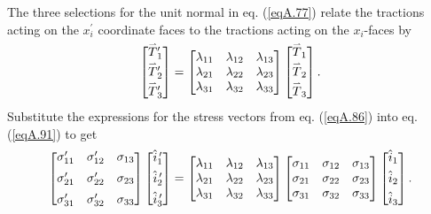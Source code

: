 \documentclass{AeroStructure-ERJohnson}
\def\harp#1{\smash{\mathord{\buildrel{\lower3pt\hbox{$\scriptscriptstyle\rightharpoonup$}}\over{#1}}}}
\begin{document}
The three selections for the unit normal in eq. (\ref{eqA.77}) relate the tractions acting on the $x_{i}^{\prime}$ coordinate faces to the tractions acting on the $x_{i}$-faces by
\begin{align}\label{eqA.91}
\left[\begin{array}{@{}c@{}}\harp{T}_{1}^{\prime} \\[4pt] \harp{T}_{2}^{\prime} \\[4pt] \harp{T}_{3}^{\prime}\end{array}\right]=\left[\begin{array}{@{}lll@{}}\lambda_{11} & \lambda_{12} & \lambda_{13} \\\lambda_{21} & \lambda_{22} & \lambda_{23} \\\lambda_{31} & \lambda_{32} & \lambda_{33}\end{array}\right]\left[\begin{array}{@{}c@{}}\harp{T}_{1} \\[4pt] \harp{T}_{2} \\[4pt] \harp{T}_{3}\end{array}\right].
\end{align}
Substitute the expressions for the stress vectors from eq. (\ref{eqA.86}) into eq. (\ref{eqA.91}) to get
\begin{align}\label{eqA.92}
\left[\begin{array}{@{}lll@{}}
\sigma_{11}^{\prime} & \sigma_{12}^{\prime} & \sigma_{13} \\[5pt]
\sigma_{21}^{\prime} & \sigma_{22}^{\prime} & \sigma_{23} \\[5pt]
\sigma_{31}^{\prime} & \sigma_{32}^{\prime} & \sigma_{33}\end{array}\right]\left[\begin{array}{@{}l@{}}\hat{i}_{1}^{\,\prime} \\[4pt] \hat{i}_{2}^{\,\prime} \\[4pt] \hat{i}_{3}^{\,\prime}\end{array}\right]=\left[\begin{array}{@{}lll@{}}\lambda_{11} & \lambda_{12} & \lambda_{13} \\\lambda_{21} & \lambda_{22} & \lambda_{23} \\\lambda_{31} & \lambda_{32} & \lambda_{33}\end{array}\right]\left[\begin{array}{@{}lll@{}}\sigma_{11} & \sigma_{12} & \sigma_{13} \\\sigma_{21} & \sigma_{22} & \sigma_{23} \\\sigma_{31} & \sigma_{32} & \sigma_{33}\end{array}\right]\left[\begin{array}{@{}l@{}}\hat{i}_{1} \\[4pt] \hat{i}_{2} \\[4pt] \hat{i}_{3}\end{array}\right].
\end{align}
\end{document}
